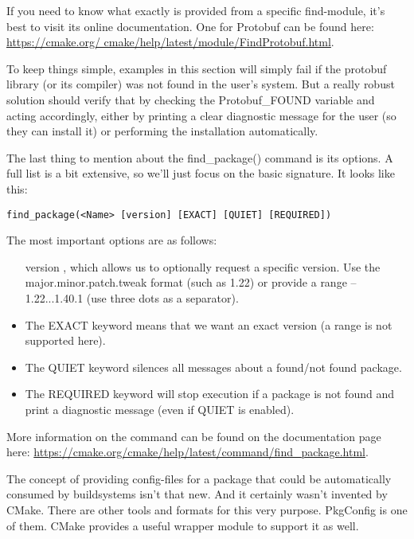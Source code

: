 If you need to know what exactly is provided from a specific find-module, it's best to visit its online documentation. One for Protobuf can be found here: \url{https://cmake.org/ cmake/help/latest/module/FindProtobuf.html}.

\begin{tcolorbox}[colback=blue!5!white,colframe=blue!75!black,title=Important Note]
To keep things simple, examples in this section will simply fail if the protobuf library (or its compiler) was not found in the user's system. But a really robust solution should verify that by checking the Protobuf\_FOUND variable and acting accordingly, either by printing a clear diagnostic message for the user (so they can install it) or performing the installation automatically.
\end{tcolorbox}

The last thing to mention about the find\_package() command is its options. A full list is a bit extensive, so we'll just focus on the basic signature. It looks like this:

\begin{lstlisting}[style=styleCMake]
find_package(<Name> [version] [EXACT] [QUIET] [REQUIRED])
\end{lstlisting}

The most important options are as follows:

\begin{itemize}
\item 
[version], which allows us to optionally request a specific version. Use the major.minor.patch.tweak format (such as 1.22) or provide a range – 1.22...1.40.1 (use three dots as a separator).

\item 
The EXACT keyword means that we want an exact version (a range is not supported here).

\item 
The QUIET keyword silences all messages about a found/not found package.

\item 
The REQUIRED keyword will stop execution if a package is not found and print a diagnostic message (even if QUIET is enabled).
\end{itemize}

More information on the command can be found on the documentation page here: \url{https://cmake.org/cmake/help/latest/command/find_package.html}.

The concept of providing config-files for a package that could be automatically consumed by buildsystems isn't that new. And it certainly wasn't invented by CMake. There are other tools and formats for this very purpose. PkgConfig is one of them. CMake provides a useful wrapper module to support it as well.





